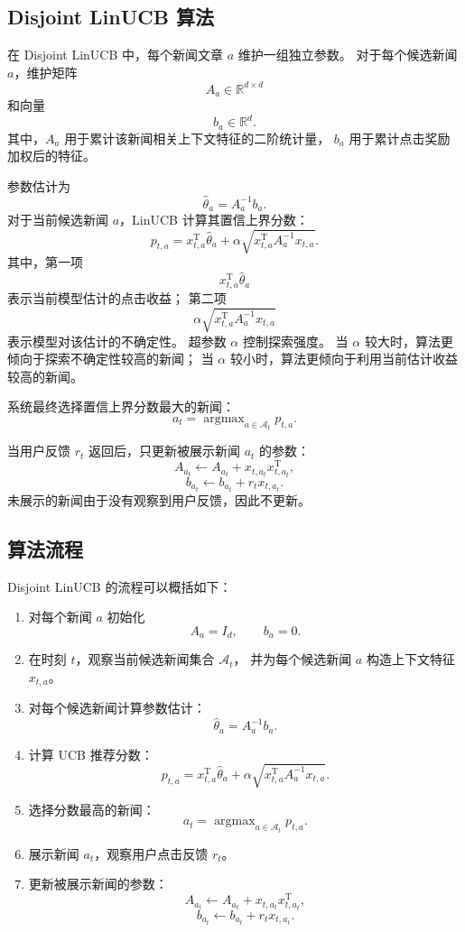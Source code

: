 \documentclass[11pt]{ctexart}
\begin{document}
\subsection{Disjoint LinUCB 算法}

在 Disjoint LinUCB 中，每个新闻文章 $a$ 维护一组独立参数。
对于每个候选新闻 $a$，维护矩阵
\[
A_a\in\mathbb{R}^{d\times d}
\]
和向量
\[
b_a\in\mathbb{R}^{d}.
\]
其中，$A_a$ 用于累计该新闻相关上下文特征的二阶统计量，
$b_a$ 用于累计点击奖励加权后的特征。

参数估计为
\[
\hat{\theta}_a=A_a^{-1}b_a.
\]
对于当前候选新闻 $a$，LinUCB 计算其置信上界分数：
\[
p_{t,a}
=
x_{t,a}^{\mathrm{T}}\hat{\theta}_a
+
\alpha
\sqrt{
x_{t,a}^{\mathrm{T}}A_a^{-1}x_{t,a}
}.
\]
其中，第一项
\[
x_{t,a}^{\mathrm{T}}\hat{\theta}_a
\]
表示当前模型估计的点击收益；
第二项
\[
\alpha
\sqrt{
x_{t,a}^{\mathrm{T}}A_a^{-1}x_{t,a}
}
\]
表示模型对该估计的不确定性。
超参数 $\alpha$ 控制探索强度。
当 $\alpha$ 较大时，算法更倾向于探索不确定性较高的新闻；
当 $\alpha$ 较小时，算法更倾向于利用当前估计收益较高的新闻。

系统最终选择置信上界分数最大的新闻：
\[
a_t
=
\mathop{\arg\max}_{a\in\mathcal{A}_t}
p_{t,a}.
\]

当用户反馈 $r_t$ 返回后，只更新被展示新闻 $a_t$ 的参数：
\[
A_{a_t}
\leftarrow
A_{a_t}
+
x_{t,a_t}x_{t,a_t}^{\mathrm{T}},
\]
\[
b_{a_t}
\leftarrow
b_{a_t}
+
r_t x_{t,a_t}.
\]
未展示的新闻由于没有观察到用户反馈，因此不更新。

\subsection{算法流程}

Disjoint LinUCB 的流程可以概括如下：

\begin{enumerate}
    \item 对每个新闻 $a$ 初始化
    \[
    A_a=I_d,\qquad b_a=0.
    \]

    \item 在时刻 $t$，观察当前候选新闻集合 $\mathcal{A}_t$，
    并为每个候选新闻 $a$ 构造上下文特征 $x_{t,a}$。

    \item 对每个候选新闻计算参数估计：
    \[
    \hat{\theta}_a=A_a^{-1}b_a.
    \]

    \item 计算 UCB 推荐分数：
    \[
    p_{t,a}
    =
    x_{t,a}^{\mathrm{T}}\hat{\theta}_a
    +
    \alpha
    \sqrt{
    x_{t,a}^{\mathrm{T}}A_a^{-1}x_{t,a}
    }.
    \]

    \item 选择分数最高的新闻：
    \[
    a_t=\mathop{\arg\max}_{a\in\mathcal{A}_t}p_{t,a}.
    \]

    \item 展示新闻 $a_t$，观察用户点击反馈 $r_t$。

    \item 更新被展示新闻的参数：
    \[
    A_{a_t}
    \leftarrow
    A_{a_t}
    +
    x_{t,a_t}x_{t,a_t}^{\mathrm{T}},
    \]
    \[
    b_{a_t}
    \leftarrow
    b_{a_t}
    +
    r_t x_{t,a_t}.
    \]
\end{enumerate}
\end{document}

